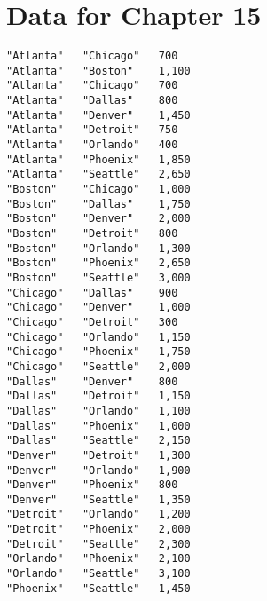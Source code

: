 





\chapter{Data for Chapter 15}
\label{distances}

\begin{verbatim}
"Atlanta"	"Chicago"	700
"Atlanta"	"Boston"	1,100
"Atlanta"	"Chicago"	700
"Atlanta"	"Dallas"	800
"Atlanta"	"Denver"	1,450
"Atlanta"	"Detroit"	750
"Atlanta"	"Orlando"	400
"Atlanta"	"Phoenix"	1,850
"Atlanta"	"Seattle"	2,650
"Boston"	"Chicago"	1,000
"Boston"	"Dallas"	1,750
"Boston"	"Denver"	2,000
"Boston"	"Detroit"	800
"Boston"	"Orlando"	1,300
"Boston"	"Phoenix"	2,650
"Boston"	"Seattle"	3,000
"Chicago"	"Dallas"	900
"Chicago"	"Denver"	1,000
"Chicago"	"Detroit"	300
"Chicago"	"Orlando"	1,150
"Chicago"	"Phoenix"	1,750
"Chicago"	"Seattle"	2,000
"Dallas"	"Denver"	800
"Dallas"	"Detroit"	1,150
"Dallas"	"Orlando"	1,100
"Dallas"	"Phoenix"	1,000
"Dallas"	"Seattle"	2,150
"Denver"	"Detroit"	1,300
"Denver"	"Orlando"	1,900
"Denver"	"Phoenix"	800
"Denver"	"Seattle"	1,350
"Detroit"	"Orlando"	1,200
"Detroit"	"Phoenix"	2,000
"Detroit"	"Seattle"	2,300
"Orlando"	"Phoenix"	2,100
"Orlando"	"Seattle"	3,100
"Phoenix"	"Seattle"	1,450
\end{verbatim}




